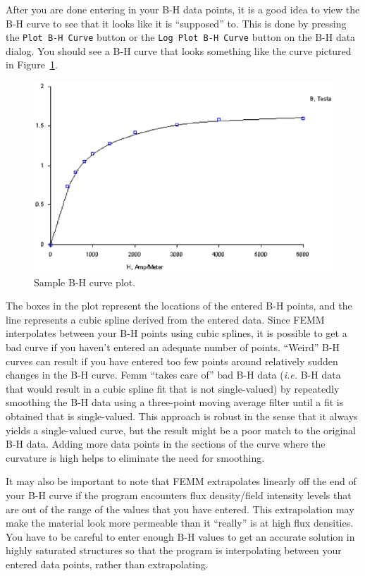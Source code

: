 \documentclass[12pt]{report}
\begin{document}
After you are done entering in your B-H data points, it is a good
idea to view the B-H curve to see that it looks like it is
``supposed'' to.  This is done by pressing the {\tt Plot B-H Curve}
button or the {\tt Log Plot B-H Curve} button on the B-H data dialog.
You should see a B-H curve that
looks something like the curve pictured in Figure~\ref{bhcurveplt}.
\begin{figure}[ht]
\centerline{\includegraphics{bhcurve.ps}}
\caption{Sample B-H curve plot.}
\label{bhcurveplt}
\end{figure} The boxes in the plot represent the locations of the entered
B-H points, and the line represents a cubic spline derived from the entered
data.  Since FEMM interpolates between your B-H points using cubic splines,
it is possible to get a bad curve if you haven't entered an adequate number
of points. ``Weird'' B-H curves can result if you have entered too few
points around relatively sudden changes in the B-H curve.  Femm ``takes care
of'' bad B-H data ({\em i.e.} B-H data that would result in a cubic spline
fit that is not single-valued) by repeatedly smoothing the B-H data using a
three-point moving average filter until a fit is obtained that is
single-valued.  This approach is robust in the sense that it always yields a
single-valued curve, but the result might be a poor match to the original
B-H data.  Adding more data points in the sections of the curve where the
curvature is high helps to eliminate the need for smoothing.

It may also be important to note that FEMM extrapolates linearly
off the end of your B-H curve if the program encounters flux
density/field intensity levels that are out of the range of the
values that you have entered. This extrapolation may make the
material look more permeable than it ``really'' is at high flux
densities. You have to be careful to enter enough B-H values to get
an accurate solution in highly saturated structures so that the
program is interpolating between your entered data points, rather
than extrapolating.
\end{document}
